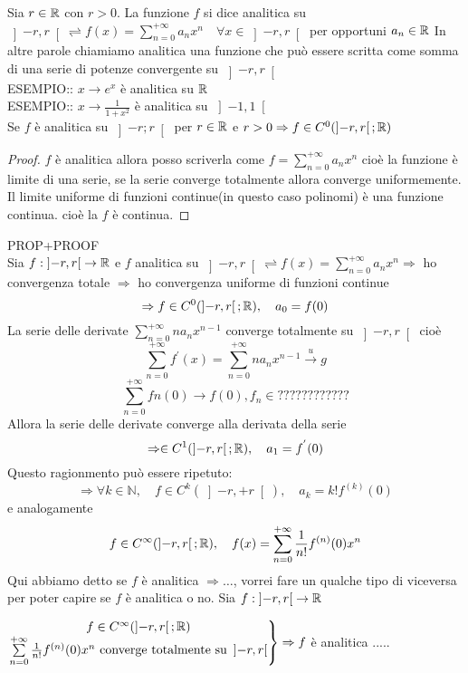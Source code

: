 Sia $r\in \mathbb{R}$ con $r>0$. La funzione $f$ si dice analitica su $\left]-r,r\right[ \rightleftharpoons f(x)=\sum\limits_{n=0}^{+\infty}a_nx^n \quad \forall x\in\left]-r,r\right[$ per opportuni $a_n\in \mathbb{R}$
\observation
In altre parole chiamiamo analitica una funzione che può essere scritta come somma di una serie di potenze convergente su $\left]-r,r\right[$ \\
ESEMPIO:: $x\to e^x$ è analitica su $ \mathbb{R}$\\
ESEMPIO:: $x\to\frac{1}{1+x^2}$ è analitica su $\left]-1,1\right[$\\
\proposition
Se $f$ è analitica su $\left]-r;r\right[$ per $r\in \mathbb{R}$ e $r>0\Rightarrow f\in C^0(\left]-r,r\right[; \mathbb{R})$
\begin{proof}
	$f$ è analitica  allora posso scriverla come $f=\sum\limits_{n=0}^{+\infty}a_nx^n$ cioè la funzione è limite di una serie, se la serie converge totalmente allora converge uniformemente. Il limite uniforme di funzioni continue(in questo caso polinomi) è una funzione continua. cioè la $f$ è continua.
\end{proof}
\proposition PROP+PROOF\\
Sia $f:\left]-r,r\right[\to \mathbb{R}$ e $f$ analitica su $\left]-r,r\right[ \rightleftharpoons f(x)=\sum\limits_{n=0}^{+\infty}a_nx^n \Rightarrow$ ho convergenza totale $\Rightarrow$ ho convergenza uniforme di funzioni continue 
$$\Rightarrow f\in C^0(\left]-r,r\right[; \mathbb{R}),\quad a_0=f(0)$$
La serie delle derivate $\sum\limits_{n=0}^{+\infty}na_nx^{n-1}$ converge totalmente su $\left]-r,r\right[$ cioè
$$\sum\limits_{n=0}^{+\infty}f^{'}(x)=\sum\limits_{n=0}^{+\infty}na_nx^{n-1}\overset{u}{\to}g$$
$$\sum\limits_{n=0}^{+\infty}fn(0)\to f(0), f_n\in ????????????$$ 
Allora la serie delle derivate converge alla derivata della serie 
$$\Rightarrow \in C^1(\left]-r,r\right[; \mathbb{R}),\quad a_1=f^{'}(0)$$ 
Questo ragionmento può essere ripetuto:
$$\Rightarrow \forall k\in\mathbb{N},\quad f\in C^k(\left]-r,+r\right[),\quad a_k=k!f^{(k)}(0)$$
e analogamente
$$f\in C^{\infty}(\left]-r,r\right[; \mathbb{R}),\quad f(x)=\sum\limits_{n=0}^{+\infty}\frac{1}{n!}f^{(n)}(0)x^n$$
\observation Qui abbiamo detto se $f$ è analitica $\Rightarrow \ldots$, vorrei fare un qualche tipo di viceversa per poter capire se $f$ è analitica o no.
\proposition
Sia $f:\left]-r,r\right[\to \mathbb{R}$
\begin{center}
	$\left.\begin{matrix}
	f\in C^{\infty}(\left]-r,r\right[; \mathbb{R})\\
	\sum\limits_{n=0}^{+\infty}\frac{1}{n!}f^{(n)}(0)x^n\text{ converge totalmente su } \left]-r,r\right[\\
	\end{matrix}\right\}\Rightarrow f$ è analitica  .....
\end{center}
